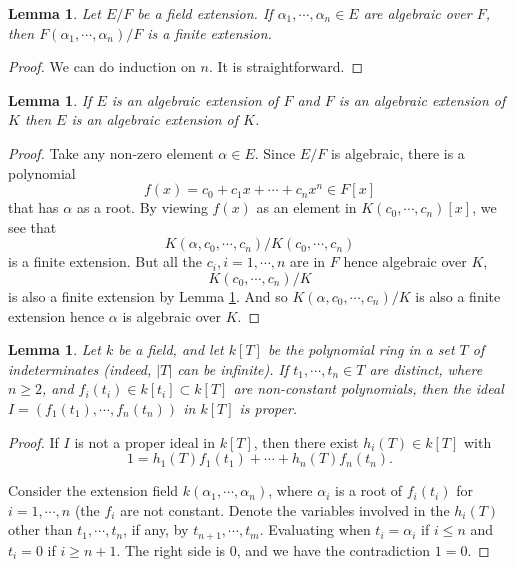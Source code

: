 \documentclass[12pt]{report}
\newtheorem{lemma}[theorem]{Lemma}
\theoremstyle{definition}
\begin{document}
\begin{lemma}\label{ac4}
	Let $E/F$ be a field extension. If $\alpha_1,\cdots,\alpha_n \in E$ are algebraic over $F$, then $F(\alpha_1,\cdots,\alpha_n)/F$  is a finite extension.
\end{lemma}

\begin{proof}
	We can do induction on $n$. It is straightforward.
\end{proof}

\begin{lemma}\label{ac3}
	If $E$ is an algebraic extension of $F$ and $F$ is an algebraic extension of $K$ then $E$ is an algebraic extension of $K$.
\end{lemma}

\begin{proof}
	Take any non-zero element $\alpha\in E$. Since $E/F$ is algebraic, there is a polynomial $$f(x)=c_0+c_1x+\cdots+c_n x^n\in F[x]$$ that has $\alpha$ as a root. By viewing $f(x)$ as an element in $K(c_0,\cdots,c_n)[x]$, we see that $$K(\alpha,c_0,\cdots,c_n)/K(c_0,\cdots,c_n)$$ is a finite extension. But all the $c_i, i=1,\cdots, n$ are in $F$ hence algebraic over $K$,$$K(c_0,\cdots,c_n)/K$$ is also a finite extension by Lemma \ref{ac4}. And so $K(\alpha,c_0,\cdots,c_n)/K$ is also a finite extension hence $\alpha$ is algebraic over $K$.
\end{proof}

\begin{lemma}\label{ac2}
	Let $k$ be a field, and let $k[T]$ be the polynomial ring in a set $T$ of indeterminates (indeed, $|T|$ can be infinite). If $t_1, \cdots, t_n \in T$ are distinct, where $n \geq 2$, and $f_i(t_i) \in k[t_i] \subset k[T]$ are non-constant polynomials, then the ideal $I = (f_1(t_1),\cdots, f_n(t_n))$ in $k[T]$ is proper.
\end{lemma}

\begin{proof}
	If $I$ is not a proper ideal in $k[T]$, then there exist $h_i(T) \in k[T]$ with $$ 1 = h_1(T)f_1(t_1) + \cdots + h_n(T)f_n(t_n).$$

	Consider the extension field $k(\alpha_1,\cdots,\alpha_n)$, where $\alpha_i$ is a root of $f_i(t_i)$ for $i = 1,\cdots , n$ (the $f_i$ are not constant. Denote the variables involved in the $h_i(T)$ other than $t_1,\cdots , t_n$, if any, by $t_{n+1}, \cdots , t_m$. Evaluating when $t_i = \alpha_i$ if $i \leq n$ and $t_i = 0$ if $i \geq n + 1$. The right side is 0, and we have the contradiction $1 = 0$.
\end{proof}
\end{document}
